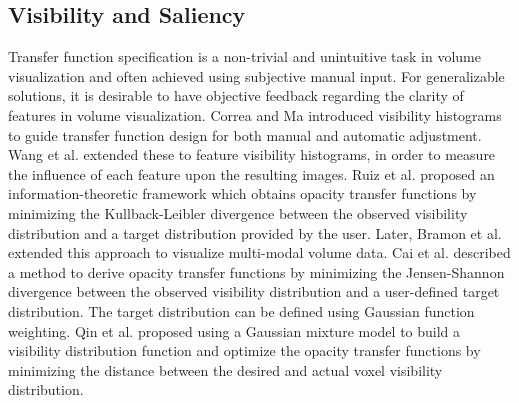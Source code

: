 \documentclass{egpubl}
\begin{document}
\subsection{Visibility and Saliency}
Transfer function specification is a non-trivial and unintuitive task in volume visualization and often achieved using subjective manual input. For generalizable solutions, it is desirable to have objective feedback regarding the clarity of features in volume visualization.
Correa and Ma \cite{correa_visibility-driven_2009} introduced visibility histograms to guide transfer function design for both manual and automatic adjustment.
Wang et al. \cite{wang_efficient_2011} extended these to feature visibility histograms, in order to measure the influence of each feature upon the resulting images.
Ruiz et al. \cite{ruiz_automatic_2011} proposed an information-theoretic framework which obtains opacity transfer functions by minimizing the Kullback-Leibler divergence between the observed visibility distribution and a target distribution provided by the user. Later, Bramon et al. \cite{bramon_information_2013} extended this approach to visualize multi-modal volume data.
Cai et al. \cite{cai_automatic_2013} described a method to derive opacity transfer functions by minimizing the Jensen-Shannon divergence between the observed visibility distribution and a user-defined target distribution. The target distribution can be defined using Gaussian function weighting.
Qin et al. \cite{qin_voxel_2015} proposed using a Gaussian mixture model to build a visibility distribution function and optimize the opacity transfer functions by minimizing the distance between the desired and actual voxel visibility distribution.
\end{document}
